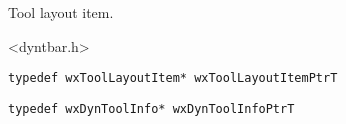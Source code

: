 %
%


\section{}\label{wxtoollayoutitem}


Tool layout item.




<dyntbar.h>


{\small \begin{verbatim}
typedef wxToolLayoutItem* wxToolLayoutItemPtrT
\end{verbatim}}

{\small \begin{verbatim}
typedef wxDynToolInfo* wxDynToolInfoPtrT
\end{verbatim}}

